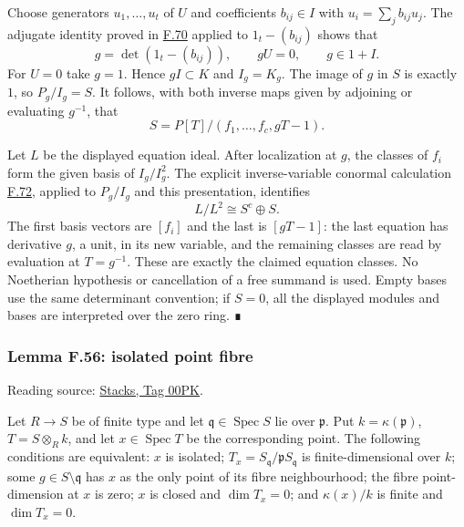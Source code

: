 \documentclass[11pt,a4paper,openany]{report}
\begin{document}
Choose generators \(u_1,\ldots,u_t\) of \(U\) and coefficients \(b_{ij}\in I\) with \(u_i=\sum_j b_{ij}u_j\). The adjugate identity proved in \hyperref[AG-RG-S05-algebra-lemma-matrix-left-inverse]{F.70} applied to \(1_t-(b_{ij})\) shows that \[g=\det(1_t-(b_{ij})),\qquad gU=0,\qquad g\in1+I.\] For \(U=0\) take \(g=1\). Hence \(gI\subset K\) and \(I_g=K_g\). The image of \(g\) in \(S\) is exactly \(1\), so \(P_g/I_g=S\). It follows, with both inverse maps given by adjoining or evaluating \(g^{-1}\), that \[S=P[T]/(f_1,\ldots,f_c,gT-1).\]

Let \(L\) be the displayed equation ideal. After localization at \(g\), the classes of \(f_i\) form the given basis of \(I_g/I_g^2\). The explicit inverse-variable conormal calculation \hyperref[AG-RG-S05-algebra-lemma-principal-localization-NL]{F.72}, applied to \(P_g/I_g\) and this presentation, identifies \[L/L^2\cong S^c\oplus S.\] The first basis vectors are \([f_i]\) and the last is \([gT-1]\): the last equation has derivative \(g\), a unit, in its new variable, and the remaining classes are read by evaluation at \(T=g^{-1}\). These are exactly the claimed equation classes. No Noetherian hypothesis or cancellation of a free summand is used. Empty bases use the same determinant convention; if \(S=0\), all the displayed modules and bases are interpreted over the zero ring. ∎

\label{AG-RG-S05-algebra-lemma-isolated-point-fibre}

\subsubsection{Lemma F.56: isolated point fibre}\label{AG-RG-S05-lemma-f.56-isolated-point-fibre}

Reading source: \href{https://stacks.math.columbia.edu/tag/00PK}{Stacks, Tag 00PK}.

Let \(R\to S\) be of finite type and let \(\mathfrak q\in\operatorname{Spec}S\) lie over \(\mathfrak p\). Put \(k=\kappa(\mathfrak p)\), \(T=S\otimes_R k\), and let \(x\in\operatorname{Spec}T\) be the corresponding point. The following conditions are equivalent: \(x\) is isolated; \(T_x=S_{\mathfrak q}/\mathfrak pS_{\mathfrak q}\) is finite-dimensional over \(k\); some \(g\in S\setminus\mathfrak q\) has \(x\) as the only point of its fibre neighbourhood; the fibre point-dimension at \(x\) is zero; \(x\) is closed and \(\dim T_x=0\); and \(\kappa(x)/k\) is finite and \(\dim T_x=0\).
\end{document}
